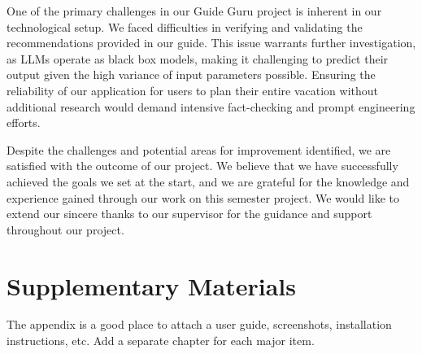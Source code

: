 \documentclass[english,notitlepage,smartquotes]{hgbreport}
\begin{document}
One of the primary challenges in our Guide Guru project is inherent in our technological setup. We faced difficulties in verifying and validating the recommendations provided in our guide. This issue warrants further investigation, as LLMs operate as black box models, making it challenging to predict their output given the high variance of input parameters possible. Ensuring the reliability of our application for users to plan their entire vacation without additional research would demand intensive fact-checking and prompt engineering efforts.

Despite the challenges and potential areas for improvement identified, we are satisfied with the outcome of our project. We believe that we have successfully achieved the goals we set at the start, and we are grateful for the knowledge and experience gained through our work on this semester project. We would like to extend our sincere thanks to our supervisor for the guidance and support throughout our project.


\appendix                                                   %

\chapter{Supplementary Materials}

The appendix is a good place to attach a user guide, screenshots, installation
instructions, etc. Add a separate chapter for each major item.

\MakeBibliography[nosplit]

\end{document}
